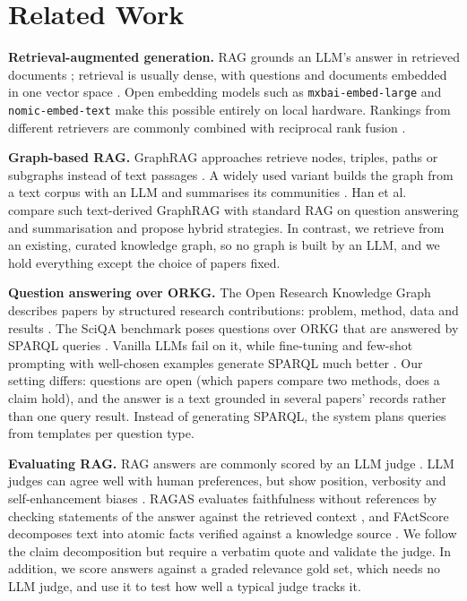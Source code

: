 
\section{Related Work}
\label{sec:related}

\textbf{Retrieval-augmented generation.} RAG grounds an LLM's answer in
retrieved documents \cite{lewis2020rag}; retrieval is usually dense, with
questions and documents embedded in one vector space \cite{karpukhin2020dpr}.
Open embedding models such as \texttt{mxbai-embed-large} \cite{mxbai2024} and
\texttt{nomic-embed-text} \cite{nussbaum2024nomic} make this possible
entirely on local hardware. Rankings from different retrievers are commonly
combined with reciprocal rank fusion \cite{cormack2009rrf}.

\textbf{Graph-based RAG.} GraphRAG approaches retrieve nodes, triples, paths
or subgraphs instead of text passages \cite{peng2024graphragsurvey}. A widely
used variant builds the graph from a text corpus with an LLM and summarises
its communities \cite{edge2024graphrag}. Han et al.\ \cite{han2025ragvsgraphrag}
compare such text-derived GraphRAG with standard RAG on question answering and
summarisation and propose hybrid strategies. In contrast, we retrieve from an
existing, curated knowledge graph, so no graph is built by an LLM, and we hold
everything except the choice of papers fixed.

\textbf{Question answering over ORKG.} The Open Research Knowledge Graph
describes papers by structured research contributions: problem, method,
data and results \cite{jaradeh2019orkg}. The SciQA benchmark poses questions
over ORKG that are answered by SPARQL queries \cite{auer2023sciqa}. Vanilla
LLMs fail on it, while fine-tuning and few-shot prompting with well-chosen
examples generate SPARQL much better \cite{lehmann2024sciqa}. Our setting
differs: questions are open (which papers compare two methods, does a claim
hold), and the answer is a text grounded in several papers' records rather
than one query result. Instead of generating SPARQL, the system plans
queries from templates per question type.

\textbf{Evaluating RAG.} RAG answers are commonly scored by an LLM judge
\cite{liu2023geval}. LLM judges can agree well with human preferences, but
show position, verbosity and self-enhancement biases \cite{zheng2023judging}.
RAGAS evaluates faithfulness without references by checking statements of
the answer against the retrieved context \cite{es2024ragas}, and FActScore
decomposes text into atomic facts verified against a knowledge source
\cite{min2023factscore}. We follow the claim decomposition but require a
verbatim quote and validate the judge. In addition, we score answers against a
graded relevance gold set, which needs no LLM judge, and use it to test how
well a typical judge tracks it.

